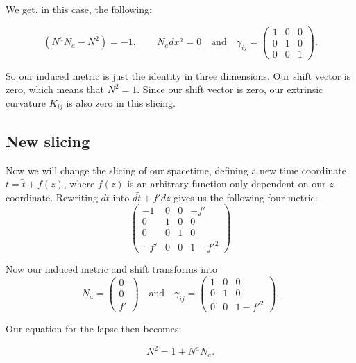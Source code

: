 \documentclass[twoside, openright]{RadboudReport}
\begin{document}
We get, in this case, the following:

\begin{equation}
	(N^aN_a-N^2) = -1, \qquad N_adx^a = 0 \quad \text{and} \quad \gamma_{ij} = 
	\begin{pmatrix}
		1 & 0 & 0 \\
		0 & 1 & 0 \\
		0 & 0 & 1 
	\end{pmatrix}.
\end{equation}

So our induced metric is just the identity in three dimensions. Our shift vector is zero, which means that $N^2 = 1$. Since our shift vector is zero, our extrinsic curvature $K_{ij}$ is also zero in this slicing.

\subsection{New slicing}

Now we will change the slicing of our spacetime, defining a new time coordinate $t = \tilde{t} + f(z)$, where $f(z)$ is an arbitrary function only dependent on our $z$-coordinate. Rewriting $dt$ into $d\tilde{t} + f'dz$ gives us the following four-metric:
\begin{equation}
	\begin{pmatrix}
		-1 & 0 & 0 & -f'\\
		0 & 1& 0 & 0\\
		0 & 0 & 1 & 0\\
		-f'& 0 & 0 & 1-f'^2
	\end{pmatrix}
\end{equation}

Now our induced metric and shift transforms into
\begin{equation}
	N_a =
	\begin{pmatrix}
		0 \\
		0\\
		f'
	\end{pmatrix}
	 \quad \text{and} \quad \gamma_{ij} = 
	\begin{pmatrix}
		1 & 0 & 0 \\
		0 & 1 & 0 \\
		0 & 0 & 1-f'^2 
	\end{pmatrix}.
\end{equation}

Our equation for the lapse then becomes:

\begin{equation}
	  N^2 = 1 + N^aN_a.
\end{equation}
\end{document}
